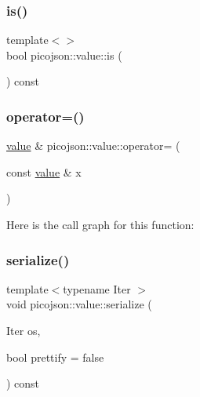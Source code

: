 \hypertarget{classpicojson_1_1value_a0b3fb432ea49151f8787026e8f8c0801}{}\label{classpicojson_1_1value_a0b3fb432ea49151f8787026e8f8c0801} 
\subsubsection{\texorpdfstring{is()}{is()}\hspace{0.1cm}{\footnotesize\ttfamily [2/2]}}
{\footnotesize\ttfamily template$<$$>$ \\
bool picojson\+::value\+::is (\begin{DoxyParamCaption}{ }\end{DoxyParamCaption}) const\hspace{0.3cm}{\ttfamily [inline]}}

\hypertarget{classpicojson_1_1value_acc5e4506e6a793af5132983573f9da6a}{}\label{classpicojson_1_1value_acc5e4506e6a793af5132983573f9da6a} 
\subsubsection{\texorpdfstring{operator=()}{operator=()}}
{\footnotesize\ttfamily \hyperlink{classpicojson_1_1value}{value} \& picojson\+::value\+::operator= (\begin{DoxyParamCaption}\item[{const \hyperlink{classpicojson_1_1value}{value} \&}]{x }\end{DoxyParamCaption})\hspace{0.3cm}{\ttfamily [inline]}}

Here is the call graph for this function\+:
\hypertarget{classpicojson_1_1value_a23664084ed4a8ecbfda901484de34bbc}{}\label{classpicojson_1_1value_a23664084ed4a8ecbfda901484de34bbc} 
\subsubsection{\texorpdfstring{serialize()}{serialize()}\hspace{0.1cm}{\footnotesize\ttfamily [1/2]}}
{\footnotesize\ttfamily template$<$typename Iter $>$ \\
void picojson\+::value\+::serialize (\begin{DoxyParamCaption}\item[{Iter}]{os,  }\item[{bool}]{prettify = {\ttfamily false} }\end{DoxyParamCaption}) const}

